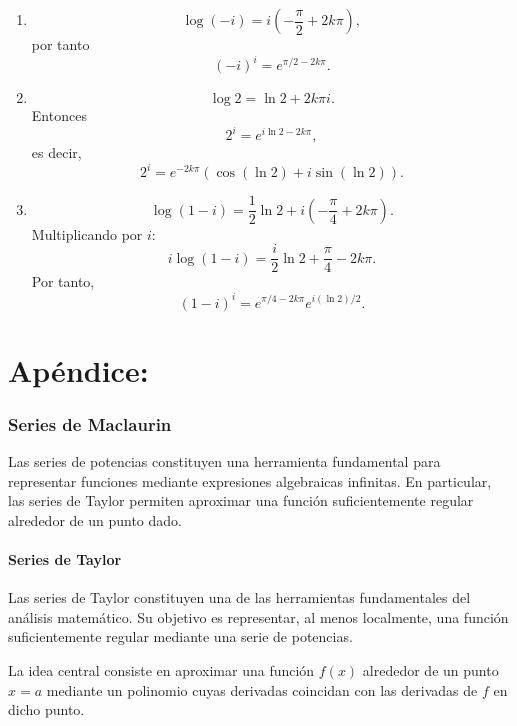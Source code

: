 \documentclass[12pt]{article}
\begin{document}
\begin{enumerate}
\item
\[
\log(-i)=i\left(-\frac{\pi}{2}+2k\pi\right),
\]
por tanto
\[
\boxed{
(-i)^i=e^{\pi/2-2k\pi}.
}
\]

\item
\[
\log2=\ln2+2k\pi i.
\]
Entonces
\[
2^i=e^{i\ln2-2k\pi},
\]
es decir,
\[
\boxed{
2^i=e^{-2k\pi}
\left(\cos(\ln2)+i\sin(\ln2)\right).
}
\]

\item
\[
\log(1-i)
=
\frac12\ln2+i\left(-\frac{\pi}{4}+2k\pi\right).
\]
Multiplicando por $i$:
\[
i\log(1-i)
=
\frac{i}{2}\ln2+\frac{\pi}{4}-2k\pi.
\]
Por tanto,
\[
\boxed{
(1-i)^i
=
e^{\pi/4-2k\pi}
e^{i(\ln2)/2}.
}
\]
\end{enumerate}
\newpage

\part{Ap\'endice:}
\setcounter{section}{0}
\section{Series de Maclaurin}


Las series de potencias constituyen una herramienta fundamental para
representar funciones mediante expresiones algebraicas infinitas. En
particular, las series de Taylor permiten aproximar una función
suficientemente regular alrededor de un punto dado.

\subsection{Series de Taylor}

Las series de Taylor constituyen una de las herramientas fundamentales del análisis matemático. Su objetivo es representar, al menos localmente, una función suficientemente regular mediante una serie de potencias.

La idea central consiste en aproximar una función \(f(x)\) alrededor de un punto \(x=a\) mediante un polinomio cuyas derivadas coincidan con las derivadas de \(f\) en dicho punto.
\end{document}
